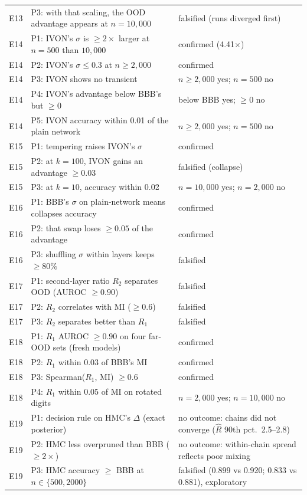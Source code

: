 \documentclass[11pt]{article}
\begin{document}
{\begin{longtable}{p{0.9cm}p{8.6cm}p{4.6cm}}
E13 & P3: with that scaling, the OOD advantage appears at $n=10{,}000$ & falsified (runs diverged first) \\
E14 & P1: IVON's $\sigma$ is $\ge2\times$ larger at $n=500$ than $10{,}000$ & confirmed (4.41$\times$) \\
E14 & P2: IVON's $\sigma\le0.3$ at $n\ge2{,}000$ & confirmed \\
E14 & P3: IVON shows no transient & $n\ge2{,}000$ yes; $n=500$ no \\
E14 & P4: IVON's advantage below BBB's but $\ge0$ & below BBB yes; $\ge0$ no \\
E14 & P5: IVON accuracy within 0.01 of the plain network & $n\ge2{,}000$ yes; $n=500$ no \\
E15 & P1: tempering raises IVON's $\sigma$ & confirmed \\
E15 & P2: at $k=100$, IVON gains an advantage $\ge0.03$ & falsified (collapse) \\
E15 & P3: at $k=10$, accuracy within 0.02 & $n=10{,}000$ yes; $n=2{,}000$ no \\
E16 & P1: BBB's $\sigma$ on plain-network means collapses accuracy & confirmed \\
E16 & P2: that swap loses $\ge0.05$ of the advantage & confirmed \\
E16 & P3: shuffling $\sigma$ within layers keeps $\ge80\%$ & falsified \\
E17 & P1: second-layer ratio $R_2$ separates OOD (AUROC $\ge0.90$) & falsified \\
E17 & P2: $R_2$ correlates with MI ($\ge0.6$) & falsified \\
E17 & P3: $R_2$ separates better than $R_1$ & falsified \\
E18 & P1: $R_1$ AUROC $\ge0.90$ on four far-OOD sets (fresh models) & confirmed \\
E18 & P2: $R_1$ within 0.03 of BBB's MI & confirmed \\
E18 & P3: Spearman($R_1$, MI) $\ge0.6$ & confirmed \\
E18 & P4: $R_1$ within 0.05 of MI on rotated digits & $n=2{,}000$ yes; $n=10{,}000$ no \\
E19 & P1: decision rule on HMC's $\Delta$ (exact posterior) & no outcome: chains did not converge ($\hat R$ 90th pct.\ 2.5--2.8) \\
E19 & P2: HMC less overpruned than BBB ($\ge2\times$) & no outcome: within-chain spread reflects poor mixing \\
E19 & P3: HMC accuracy $\ge$ BBB at $n\in\{500,2000\}$ & falsified (0.899 vs 0.920; 0.833 vs 0.881), exploratory \\

\end{longtable}}
\end{document}
